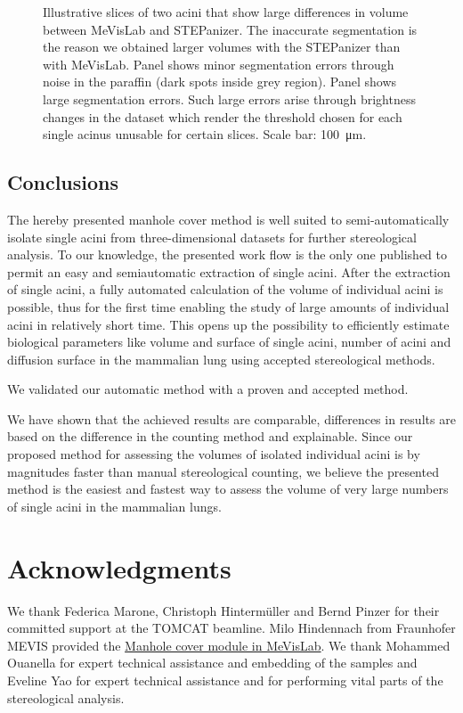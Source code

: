 \documentclass[a4paper,DIVcalc,abstract,english]{scrartcl}
\begin{document}
\begin{figure}[htb]
{		\label{subfig:60e_acinus38}%
	}%
	\hfill%
	\caption{Illustrative slices of two acini that show large differences in volume between MeVisLab and STEPanizer.
		The inaccurate segmentation is the reason we obtained larger volumes with the STEPanizer than with MeVisLab.
		Panel \protect{} shows minor segmentation errors through noise in the paraffin (dark spots inside grey region).
		Panel \protect{} shows large segmentation errors.
		Such large errors arise through brightness changes in the dataset which render the threshold chosen for each single acinus unusable for certain slices.
		Scale bar: \SI{100}{\micro\meter}.}
	\label{fig:MeVisSegmentation}
\end{figure}

\subsection{Conclusions}
The hereby presented manhole cover method is well suited to semi-automatically isolate single acini from three-dimensional datasets for further stereological analysis.
To our knowledge, the presented work flow is the only one published to permit an easy and semiautomatic extraction of single acini.
After the extraction of single acini, a fully automated calculation of the volume of individual acini is possible, thus for the first time enabling the study of large amounts of individual acini in relatively short time.
This opens up the possibility to efficiently estimate biological parameters like volume and surface of single acini, number of acini and diffusion surface in the mammalian lung using accepted stereological methods.

We validated our automatic method with a proven and accepted method.

We have shown that the achieved results are comparable, differences in results are based on the difference in the counting method and explainable.
Since our proposed method for assessing the volumes of isolated individual acini is by magnitudes faster than manual stereological counting, we believe the presented method is the easiest and fastest way to assess the volume of very large numbers of single acini in the mammalian lungs.

\clearpage
\section{Acknowledgments}
We thank Federica Marone, Christoph Hintermüller and Bernd Pinzer for their committed support at the TOMCAT beamline.
Milo Hindennach from Fraunhofer MEVIS provided the \href{http://www.mevis-research.de/cgi-bin/discus/board-auth.cgi?lm=1282233250&file=/839/11760.html}{Manhole cover module in MeVisLab}.
We thank Mohammed Ouanella for expert technical assistance and embedding of the samples and Eveline Yao for expert technical assistance and for performing vital parts of the stereological analysis.
\end{document}
